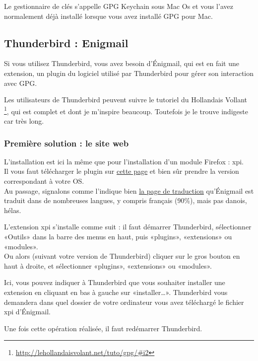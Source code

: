 Le gestionnaire de clés s'appelle GPG Keychain sous Mac Os et vous
l'avez normalement déjà installé lorsque vous avez installé GPG pour
Mac.

\subsection{Thunderbird : Enigmail}\label{thunderbird-enigmail}

Si vous utilisez Thunderbird, vous avez besoin d'Énigmail, qui est en
fait une extension, un plugin du logiciel utilisé par Thunderbird pour
gérer son interaction avec GPG.

Les utilisateurs de Thunderbird peuvent suivre le tutoriel du Hollandais Vollant
\footnote{\url{http://lehollandaisvolant.net/tuto/gpg/\#i2}}, qui est
complet et dont je m'inspire beaucoup. Toutefois je le trouve indigeste
car très long.

\subsubsection{Première solution : le site web}\label{premiuxe8re-solution-le-site-web}

L'installation est ici la même que pour l'installation d'un module
Firefox : xpi.\\Il vous faut télécharger le plugin sur
\href{https://www.enigmail.net/download/}{cette page} et bien sûr
prendre la version correspondant à votre OS.\\Au passage, signalons
comme l'indique bien
\href{http://beta.babelzilla.org/projects/p/Enigmail/}{la page de
traduction} qu'Énigmail est traduit dans de nombreuses langues, y
compris français (90\%), mais pas danois, hélas.

L'extension xpi s'installe comme suit : il faut démarrer Thunderbird,
sélectionner «Outils» dans la barre des menus en haut, puis «plugins»,
«extensions» ou «modules».\\Ou alors (suivant votre version de
Thunderbird) cliquer sur le gros bouton en haut à droite, et
sélectionner «plugins», «extensions» ou «modules».

Ici, vous pouvez indiquer à Thunderbird que vous souhaiter installer une
extension en cliquant en bas à gauche sur «installer\ldots{}».
Thunderbird vous demandera dans quel dossier de votre ordinateur vous
avez téléchargé le fichier xpi d'Énigmail.

Une fois cette opération réalisée, il faut redémarrer Thunderbird.

